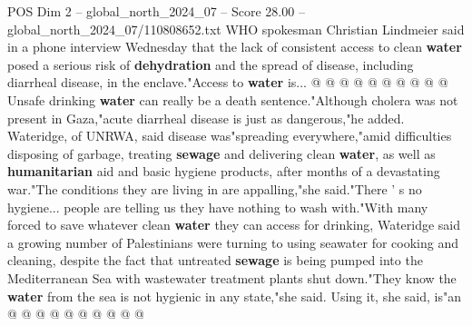 \begin{textsample}{POS Dim 2 – global\_north\_2024\_07 – Score 28.00 – global\_north\_2024\_07/110808652.txt}
WHO spokesman Christian Lindmeier said in a phone interview Wednesday that the lack of consistent access to clean \textbf{water} posed a serious risk of \textbf{dehydration} and the spread of disease, including diarrheal disease, in the enclave."Access to \textbf{water} is... @ @ @ @ @ @ @ @ @ @ Unsafe drinking \textbf{water} can really be a death sentence."Although cholera was not present in Gaza,"acute diarrheal disease is just as dangerous,"he added.
Wateridge, of UNRWA, said disease was"spreading everywhere,"amid difficulties disposing of garbage, treating \textbf{sewage} and delivering clean \textbf{water}, as well as \textbf{humanitarian} aid and basic hygiene products, after months of a devastating war."The conditions they are living in are appalling,"she said."There ' s no hygiene... people are telling us they have nothing to wash with."With many forced to save whatever clean \textbf{water} they can access for drinking, Wateridge said a growing number of Palestinians were turning to using seawater for cooking and cleaning, despite the fact that untreated \textbf{sewage} is being pumped into the Mediterranean Sea with wastewater treatment plants shut down."They know the \textbf{water} from the sea is not hygienic in any state,"she said.
Using it, she said, is"an @ @ @ @ @ @ @ @ @ @

\end{textsample}
